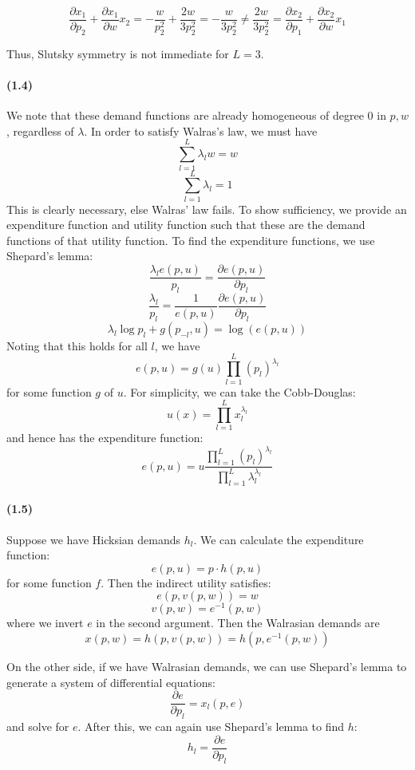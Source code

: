 \documentclass[10pt,letter]{article}
\begin{document}
\[\frac{\partial x_1}{\partial p_2} + \frac{\partial x_1}{\partial w}x_2 = -\frac{w}{p_2^2} + \frac{2w}{3p_2^2} = -\frac{w}{3p_2^2} \neq \frac{2w}{3p_2^2}  = \frac{\partial x_2}{\partial p_1} + \frac{\partial x_2}{\partial w}x_1 \]

Thus, Slutsky symmetry is not immediate for $L=3$.

\paragraph{(1.4)}
We note that these demand functions are already homogeneous of degree 0 in $p,w$, regardless of $\lambda$. In order to satisfy Walras's law, we must have
\[ \sum_{l=1}^L \lambda_lw = w \]
\[ \sum_{l=1}^L \lambda_l = 1 \]
This is clearly necessary, else Walras' law fails. To show sufficiency, we provide an expenditure function and utility function such that these are the demand functions of that utility function. To find the expenditure functions, we use Shepard's lemma:
\[ \frac{\lambda_l e(p, u)}{p_l} = \frac{\partial e(p,u)}{\partial p_l}  \]
\[ \frac{\lambda_l}{p_l} = \frac{1}{e(p,u)} \frac{\partial e(p,u)}{\partial p_l}  \]
\[ \lambda_l \log p_l + g(p_{-l}, u) = \log (e(p,u)) \]
Noting that this holds for all $l$, we have
\[ e(p,u) = g(u)\prod_{l=1}^L (p_l)^{\lambda_l}  \]
for some function $g$ of $u$. For simplicity, we can take the Cobb-Douglas:
\[ u(x) = \prod_{l=1}^L x_l^{\lambda_l} \]
and hence has the expenditure function:
\[ e(p,u) = u\frac{\prod_{l=1}^L (p_l)^{\lambda_l}}{\prod_{l=1}^L \lambda_l^{\lambda_l}} \]
\paragraph{(1.5)}
Suppose we have Hicksian demands $h_l$. We can calculate the expenditure function:
\[ e(p,u) = p \cdot h(p,u) \]
for some function $f$. Then the indirect utility satisfies:
\[ e(p,v(p,w)) = w   \]
\[ v(p,w) = e^{-1}\left( p, w \right) \]
where we invert $e$ in the second argument.
Then the Walrasian demands are
\[ x(p,w) = h(p,v(p,w)) = h\left(p, e^{-1}\left( p, w \right)\right) \]

On the other side, if we have Walrasian demands, we can use Shepard's lemma to generate a system of differential equations:
\[ \frac{\partial e}{\partial p_l} = x_l(p, e) \]
and solve for $e$. After this, we can again use Shepard's lemma to find $h$:
\[ h_l = \frac{\partial e}{\partial p_l} \]
\end{document}
